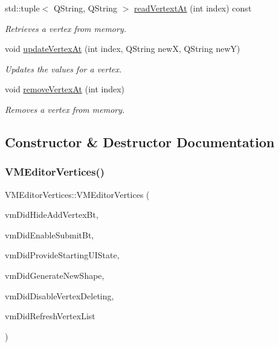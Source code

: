 \begin{DoxyCompactItemize}
std\+::tuple$<$ Q\+String, Q\+String $>$ \mbox{\hyperlink{class_v_m_editor_vertices_a3629c7c6ec4cdc153bc12bed2f1504e8}{read\+Vertext\+At}} (int index) const
\begin{DoxyCompactList}\small\item\em Retrieves a vertex from memory. \end{DoxyCompactList}\item 
void \mbox{\hyperlink{class_v_m_editor_vertices_addd6dff8c7d5a7d582d9b6cb4f677843}{update\+Vertex\+At}} (int index, Q\+String newX, Q\+String newY)
\begin{DoxyCompactList}\small\item\em Updates the values for a vertex. \end{DoxyCompactList}\item 
void \mbox{\hyperlink{class_v_m_editor_vertices_a5f1f8f3172ff525863df9bd619d57001}{remove\+Vertex\+At}} (int index)
\begin{DoxyCompactList}\small\item\em Removes a vertex from memory. \end{DoxyCompactList}\end{DoxyCompactItemize}


\subsection{Constructor \& Destructor Documentation}
\mbox{\label{class_v_m_editor_vertices_ace292193ea7f4a08d79c590a17384c57}} 
\subsubsection{\texorpdfstring{VMEditorVertices()}{VMEditorVertices()}}
{\footnotesize\ttfamily V\+M\+Editor\+Vertices\+::\+V\+M\+Editor\+Vertices (\begin{DoxyParamCaption}\item[{std\+::function$<$ void(bool)$>$}]{vm\+Did\+Hide\+Add\+Vertex\+Bt,  }\item[{std\+::function$<$ void(bool)$>$}]{vm\+Did\+Enable\+Submit\+Bt,  }\item[{std\+::function$<$ void()$>$}]{vm\+Did\+Provide\+Starting\+U\+I\+State,  }\item[{std\+::function$<$ void(\mbox{\hyperlink{class_i_shape}{I\+Shape}} $\ast$)$>$}]{vm\+Did\+Generate\+New\+Shape,  }\item[{std\+::function$<$ void(bool)$>$}]{vm\+Did\+Disable\+Vertex\+Deleting,  }\item[{std\+::function$<$ void()$>$}]{vm\+Did\+Refresh\+Vertex\+List }\end{DoxyParamCaption})}



